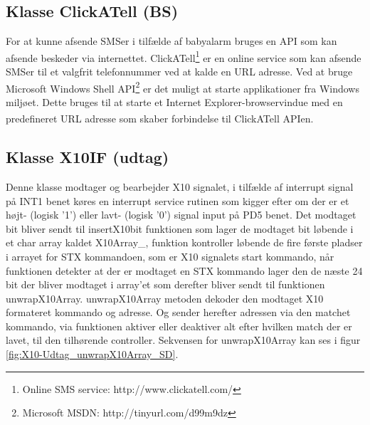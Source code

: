 \subsection{Klasse ClickATell (BS)}
For at kunne afsende SMSer i tilfælde af babyalarm bruges en API som kan afsende beskeder via internettet.
ClickATell\textsuperscript{\circledR}\footnote{Online SMS service: http://www.clickatell.com/} er en online service som kan afsende SMSer til et valgfrit telefonnummer ved at kalde en URL adresse.
Ved at bruge Microsoft Windows Shell API\footnote{Microsoft MSDN: http://tinyurl.com/d99m9dz} er det muligt at starte applikationer fra Windows miljøet. Dette bruges til at starte et Internet Explorer-browservindue med en predefineret URL adresse som skaber forbindelse til ClickATell\textsuperscript{\circledR} APIen. 

\subsection{Klasse X10IF (udtag)}
Denne klasse modtager og bearbejder X10 signalet, i tilfælde af interrupt signal på INT1 benet køres en interrupt service rutinen som kigger efter om der er et højt- (logisk '1') eller lavt- (logisk '0') signal input på PD5 benet. Det modtaget bit bliver sendt til insertX10bit funktionen som lager de modtaget bit løbende i et char array kaldet X10Array\_, funktion kontroller løbende de fire første pladser i arrayet for STX kommandoen, som er X10 signalets start kommando, når funktionen detekter at der er modtaget en STX kommando lager den de næste 24 bit der bliver modtaget i array'et som derefter bliver sendt til funktionen unwrapX10Array. unwrapX10Array metoden dekoder den modtaget X10 formateret kommando og adresse. Og sender herefter adressen via den matchet kommando, via funktionen aktiver eller deaktiver alt efter hvilken match der er lavet, til den tilhørende controller.
Sekvensen for unwrapX10Array kan ses i figur \ref{fig:X10-Udtag_unwrapX10Array_SD}.


